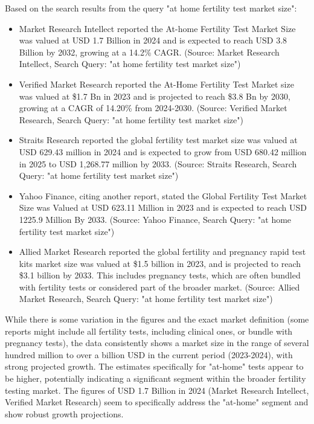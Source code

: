 \documentclass{article}
\begin{document}
Based on the search results from the query "at home fertility test market size":
\begin{itemize}
    \item Market Research Intellect reported the At-home Fertility Test Market Size was valued at USD 1.7 Billion in 2024 and is expected to reach USD 3.8 Billion by 2032, growing at a 14.2\% CAGR. (Source: Market Research Intellect, Search Query: "at home fertility test market size")
    \item Verified Market Research reported the At-Home Fertility Test Market size was valued at \$1.7 Bn in 2023 and is projected to reach \$3.8 Bn by 2030, growing at a CAGR of 14.20\% from 2024-2030. (Source: Verified Market Research, Search Query: "at home fertility test market size")
    \item Straits Research reported the global fertility test market size was valued at USD 629.43 million in 2024 and is expected to grow from USD 680.42 million in 2025 to USD 1,268.77 million by 2033. (Source: Straits Research, Search Query: "at home fertility test market size")
    \item Yahoo Finance, citing another report, stated the Global Fertility Test Market Size was Valued at USD 623.11 Million in 2023 and is expected to reach USD 1225.9 Million By 2033. (Source: Yahoo Finance, Search Query: "at home fertility test market size")
    \item Allied Market Research reported the global fertility and pregnancy rapid test kits market size was valued at \$1.5 billion in 2023, and is projected to reach \$3.1 billion by 2033. This includes pregnancy tests, which are often bundled with fertility tests or considered part of the broader market. (Source: Allied Market Research, Search Query: "at home fertility test market size")
\end{itemize}

While there is some variation in the figures and the exact market definition (some reports might include all fertility tests, including clinical ones, or bundle with pregnancy tests), the data consistently shows a market size in the range of several hundred million to over a billion USD in the current period (2023-2024), with strong projected growth. The estimates specifically for "at-home" tests appear to be higher, potentially indicating a significant segment within the broader fertility testing market. The figures of USD 1.7 Billion in 2024 (Market Research Intellect, Verified Market Research) seem to specifically address the "at-home" segment and show robust growth projections.
\end{document}
